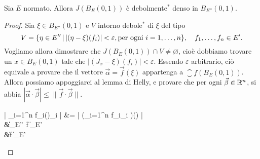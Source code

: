 \begin{lemma}[Goldstein]
	Sia $E$ normato.
	Allora $J(B_E(0,1))$ è debolmente$^*$ denso in $B_{E''}(0,1)$.
\end{lemma}
\begin{proof}
	Sia $\xi \in B_{E''}(0,1)$ e $V$ intorno debole$^*$ di $\xi$ del tipo
	\begin{equation*}
		V = \{ \eta \in E'' \,|\, |(\eta-\xi)(f_i)| < \varepsilon, \text{per ogni $i=1,\ldots,n$} \}, \quad f_1, \ldots, f_n \in E'.
	\end{equation*}
	Vogliamo allora dimostrare che $J(B_E(0,1)) \cap V \neq \varnothing$, cioè dobbiamo trovare un $x \in B_E(0,1)$ tale che $|(J_x - \xi)(f_i)| < \varepsilon$. Essendo $\varepsilon$ arbitrario, ciò equivale a provare che il vettore $\vec\alpha = \vec f(\xi)$ appartenga a $\closure{f(B_E(0,1))}$. Allora possiamo appoggiarci al lemma di Helly, e provare che per ogni $\vec\beta \in \mathbb{R}^n$, si abbia $|\vec\alpha \cdot \vec\beta| \leq \|\vec f \cdot \vec\beta\|$.
	\begin{eqalign*}
		\left| \sum_{i=1}^n f_i(\xi)\beta_i \right| &= \left| \left(\sum_{i=1}^n f_i\beta_i \right)(\xi) \right|\\
		&\leq \|\xi\|_{E''}\, \|\vec f \cdot \vec\beta\|_{E'}\\
		&\leq \|\vec f \cdot \vec \beta\|_{E'} 
	\end{eqalign*}
\end{proof}

